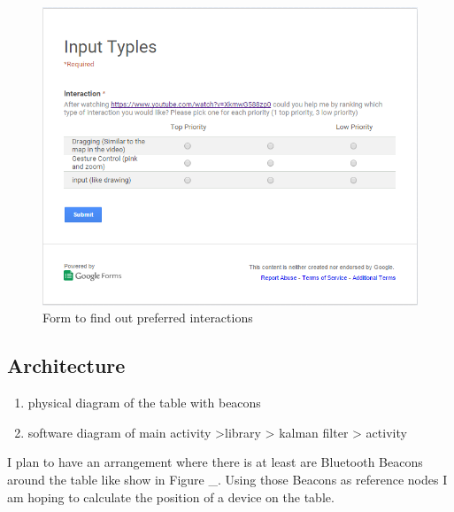 \begin{figure}[h]
  \includegraphics[scale=0.7]{images/googleform}
  \protect\caption{Form to find out preferred interactions} 
  \label{googleform}
\end{figure}


\subsection{Architecture} \label{nocamer_architecture}
 \begin{enumerate}
 \item physical diagram of the table with beacons
 \item software diagram of main activity \-\->library \-\-> kalman filter \-\-> activity
 \end{enumerate}
 I plan to have an arrangement where there is at least are Bluetooth Beacons around the table like show in Figure \_. Using those Beacons as reference nodes I am hoping to calculate the position of a device on the table.

